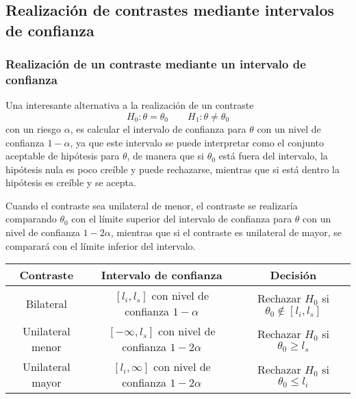 \subsection{Realización de contrastes mediante intervalos de confianza}
\begin{frame}
\frametitle{Realización de un contraste mediante un intervalo de confianza}
Una interesante alternativa a la realización de un contraste
\[
H_0: \theta=\theta_0\qquad
H_1: \theta\neq \theta_0
\]
con un riesgo $\alpha$, es calcular el intervalo de confianza para $\theta$ con un nivel de confianza $1-\alpha$, ya que este intervalo se puede interpretar como el conjunto aceptable de hipótesis para $\theta$, de manera que si $\theta_0$ está fuera del intervalo, la hipótesis nula es poco creíble y puede rechazarse, mientras que si está dentro la hipótesis es creíble y se acepta.

Cuando el contraste sea unilateral de menor, el contraste se realizaría comparando $\theta_0$ con el límite superior del intervalo de confianza para $\theta$ con un nivel de confianza $1-2\alpha$, mientras que si el contraste es unilateral de mayor, se comparará con el límite inferior del intervalo.
{\small
\begin{center}
\begin{tabular}{|c|c|c|}
\hline
Contraste & Intervalo de confianza & Decisión\\
\hline
Bilateral & $[l_i,l_s]$ con nivel de confianza $1-\alpha$ & Rechazar $H_0$ si $\theta_0\not \in [l_i,l_s]$\\
Unilateral menor & $[-\infty,l_s]$ con nivel de confianza $1-2\alpha$ & Rechazar $H_0$ si $\theta_0\geq l_s$\\
Unilateral mayor & $[l_i,\infty]$ con nivel de confianza $1-2\alpha$ & Rechazar $H_0$ si $\theta_0\leq l_i$\\
\hline
\end{tabular}
\end{center}
}
\end{frame}


